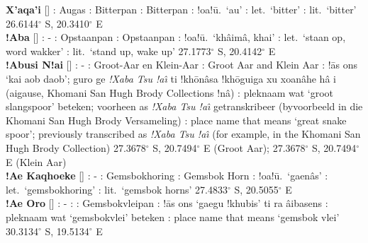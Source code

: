 \textbf{\textdoublevertline{}X'aqa'i}
[] :
Au\textdoublebarpipe{}gas : Bitterpan :
Bitterpan : !oa!\={u}.\ `au' : let.\
`bitter' : lit.\ `bitter' 26.6144$^{\circ}$ S,
20.3410$^{\circ}$ E \\

\textbf{!Aba} [] : -
: Opstaanpan : Opstaanpan :
!oa!\={u}.\ `kh\^{a}im\^{a}, \textdoublebarpipe{}khai' \underbar{Afr}:
let.\ `staan op, word wakker' \underbar{Eng}: lit.\ `stand up, wake
up' 27.1773$^{\circ}$ S, 20.4142$^{\circ}$ E \\

\textbf{!Abusi N!ai} []
: - : Groot-Aar en Klein-Aar
: Groot Aar and Klein Aar \underbar{Nama}: !\={a}s
\textvertline{}ons `kai \textvertline{}aob daob';
\textdoublebarpipe{}guro ge \emph{!Xaba Tsu !a\^{\i}} ti
!kh\={o}\textdoublevertline{}n\^{a}sa
!kh\={o}\textdoublevertline{}guiga xu xoa\textdoublevertline{}n\^{a}he
h\^{a} i (ai\textdoublevertline{}gause, \textdoublebarpipe{}Khomani
San Hugh Brody Collections !n\^{a}) \underbar{Afr}: pleknaam wat
`groot slangspoor' beteken; voorheen as \emph{!Xaba Tsu !a\^{\i}}
getranskribeer (byvoorbeeld in die \textdoublebarpipe{}Khomani San
Hugh Brody Versameling) \underbar{Eng}: place name that means `great
snake spoor'; previously transcribed as \emph{!Xaba Tsu !a\^{\i}} (for
example, in the \textdoublebarpipe{}Khomani San Hugh Brody Collection)
27.3678$^{\circ}$ S, 20.7494$^{\circ}$ E (Groot Aar);
27.3678$^{\circ}$ S, 20.7494$^{\circ}$ E (Klein Aar) \\

\textbf{!Ae Ka\textdoublevertline{}qhoeke} [] : -
: Gemsbokhoring : Gemsbok Horn
\underbar{Nama}: !oa!\={u}.\
`\textvertline{}gae\textdoublevertline{}n\^{a}s' : let.\
`gemsbokhoring' : lit.\ `gemsbok horns'
27.4833$^{\circ}$ S, 20.5055$^{\circ}$ E \\

\textbf{!Ae \textdoublebarpipe{}Oro} [\textipa{!@e
\textdoublebarpipe{}oro}] \underbar{Nama}: - :
: Gemsbokvleipan : !\={a}s
\textvertline{}ons `\textvertline{}gaegu !khubis' ti ra
\textdoublebarpipe{}\^{a}ibasens \underbar{Afr}: pleknaam wat
`gemsbokvlei' beteken \underbar{Eng}: place name that means `gemsbok
vlei' 30.3134$^{\circ}$ S, 19.5134$^{\circ}$ E \\

